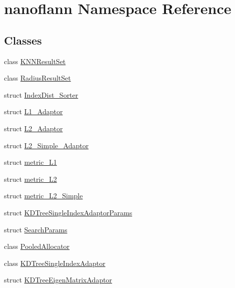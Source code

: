 \hypertarget{namespacenanoflann}{\section{nanoflann Namespace Reference}
\label{namespacenanoflann}
}
\subsection*{Classes}
\begin{DoxyCompactItemize}
\item 
class \hyperlink{classnanoflann_1_1_k_n_n_result_set}{K\-N\-N\-Result\-Set}
\item 
class \hyperlink{classnanoflann_1_1_radius_result_set}{Radius\-Result\-Set}
\item 
struct \hyperlink{structnanoflann_1_1_index_dist___sorter}{Index\-Dist\-\_\-\-Sorter}
\item 
struct \hyperlink{structnanoflann_1_1_l1___adaptor}{L1\-\_\-\-Adaptor}
\item 
struct \hyperlink{structnanoflann_1_1_l2___adaptor}{L2\-\_\-\-Adaptor}
\item 
struct \hyperlink{structnanoflann_1_1_l2___simple___adaptor}{L2\-\_\-\-Simple\-\_\-\-Adaptor}
\item 
struct \hyperlink{structnanoflann_1_1metric___l1}{metric\-\_\-\-L1}
\item 
struct \hyperlink{structnanoflann_1_1metric___l2}{metric\-\_\-\-L2}
\item 
struct \hyperlink{structnanoflann_1_1metric___l2___simple}{metric\-\_\-\-L2\-\_\-\-Simple}
\item 
struct \hyperlink{structnanoflann_1_1_k_d_tree_single_index_adaptor_params}{K\-D\-Tree\-Single\-Index\-Adaptor\-Params}
\item 
struct \hyperlink{structnanoflann_1_1_search_params}{Search\-Params}
\item 
class \hyperlink{classnanoflann_1_1_pooled_allocator}{Pooled\-Allocator}
\item 
class \hyperlink{classnanoflann_1_1_k_d_tree_single_index_adaptor}{K\-D\-Tree\-Single\-Index\-Adaptor}
\item 
struct \hyperlink{structnanoflann_1_1_k_d_tree_eigen_matrix_adaptor}{K\-D\-Tree\-Eigen\-Matrix\-Adaptor}
\end{DoxyCompactItemize}
